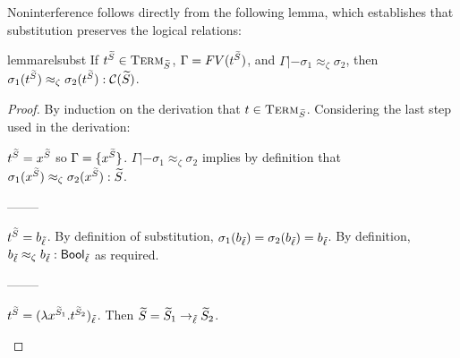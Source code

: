 \documentclass[authoryear,sort&compress,9pt,twocolumn,nocopyrightspace]{sigplanconf}
\newcommand{\Bool}{\mathsf{Bool}}
\newcommand{\oblset}[1]{\textsc{#1}}
\newcommand{\?}{\textsf{\upshape ?}} \newcommand{\consistent}[1]{\widetilde{#1}}
\newcommand{\TermT}[1]{\oblset{Term}_{#1}}
\newcommand{\lobs}{\zeta}
\newcommand{\rel}{\approx_{\lobs}}
\newcommand{\rcomp}[1]{\mathcal{C}(#1)}
\newcommand{\subst}{\sigma}
\newcommand{\itm}[1]{{t^{\cS_{#1}}}}
\begin{document}
Noninterference follows directly from the following lemma, which
establishes that substitution preserves the logical relations:
\begin{restatable}{lemma}{relsubst}
\label{lm:relsubst}
If $\itm{} \in \TermT{\cS}$, $\Gamma = FV(\itm{})$, and $\Gamma |- \subst_1 \rel
\subst_2$, then $\subst_1(\itm{}) \rel \subst_2(\itm{}) : \rcomp{\cS}$.
\end{restatable}
\begin{proof}
By induction on the derivation that $t \in \TermT{\cS}$. Considering
the last step used in the derivation:

\begin{case}[$x$] $\itm{} = x^\cS$ so $\Gamma = \{ x^\cS \}$. $\Gamma |- \subst_1 \rel
\subst_2$ implies by definition that $\subst_1(x^\cS) \rel
\subst_2(x^\cS) : \cS$.
\end{case}

\begin{center}--------\end{center}
\begin{case}[$b$] $\itm{} = b_\clx$. By definition of substitution,
  $\subst_1(b_\clx) = \subst_2(b_\clx) = b_\clx$. By definition,
  $b_\clx \rel b_\clx : \Bool_\clx$ as required.
\end{case}

\begin{center}--------\end{center}
\begin{case}[$\lambda$]
$\itm{} = (\lambda x^{\cS_1}.t^{\cS_2})_\clx$. Then $\cS = \cS_1 ->_\clx \cS_2$.


\end{case}
\end{proof}
\end{document}
